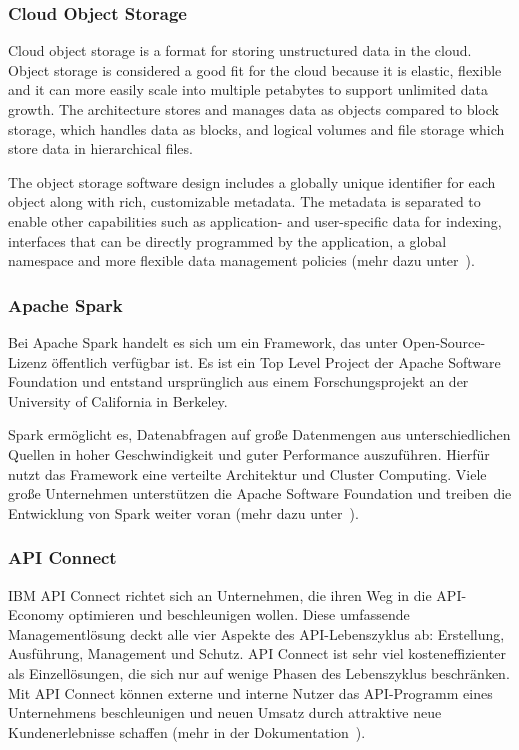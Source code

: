\subsubsection{Cloud Object Storage}
Cloud object storage is a format for storing unstructured data in the cloud. Object storage is considered a good fit for
the cloud because it is elastic, flexible and it can more easily scale into multiple petabytes to support unlimited data
growth. The architecture stores and manages data as objects compared to block storage, which handles data as blocks, and
logical volumes and file storage which store data in hierarchical files.


The object storage software design includes a globally unique identifier for each object along with rich, customizable
metadata. The metadata is separated to enable other capabilities such as application- and user-specific data for
indexing, interfaces that can be directly programmed by the application, a global namespace and more flexible data
management policies (mehr dazu unter~\cite{book_grundlagen_objectstorage}).

\subsubsection{Apache Spark}
Bei Apache Spark handelt es sich um ein Framework, das unter Open-Source-Lizenz öffentlich verfügbar ist. Es ist ein Top
Level Project der Apache Software Foundation und entstand ursprünglich aus einem Forschungsprojekt an der University of
California in Berkeley.

Spark ermöglicht es, Datenabfragen auf große Datenmengen aus unterschiedlichen Quellen in hoher Geschwindigkeit und
guter Performance auszuführen. Hierfür nutzt das Framework eine verteilte Architektur und Cluster Computing. Viele
große Unternehmen unterstützen die Apache Software Foundation und treiben die Entwicklung von Spark weiter voran
(mehr dazu unter~\cite{book_grundlagen_apachespark}).

\subsubsection{API Connect}
IBM API Connect richtet sich an Unternehmen, die ihren Weg in die API-Economy optimieren und beschleunigen wollen.
Diese umfassende Managementlösung deckt alle vier Aspekte des API-Lebenszyklus ab: Erstellung, Ausführung, Management
und Schutz. API Connect ist sehr viel kosteneffizienter als Einzellösungen, die sich nur auf wenige Phasen des
Lebenszyklus beschränken. Mit API Connect können externe und interne Nutzer das API-Programm eines Unternehmens
beschleunigen und neuen Umsatz durch attraktive neue Kundenerlebnisse schaffen
(mehr in der Dokumentation~\cite{book_grundlagen_apiconnect}).

